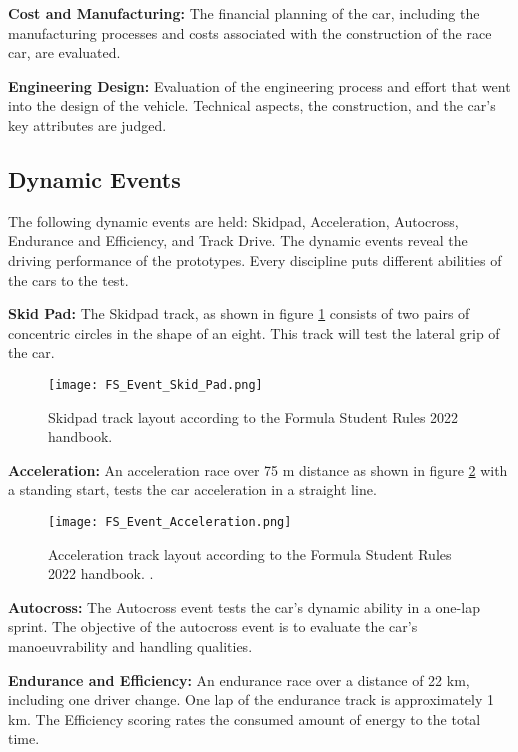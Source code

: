 \textbf{Cost and Manufacturing:} The financial planning of the car, including the manufacturing processes and costs associated with the construction of the race car, are evaluated.

\textbf{Engineering Design:} Evaluation of the engineering process and effort that went into the design of the vehicle. Technical aspects, the construction, and the car's key attributes are judged.

\subsection{Dynamic Events} \label{sec:Dynamic Events}
The following dynamic events are held: Skidpad, Acceleration, Autocross, Endurance and Efficiency, and Track Drive.
The dynamic events reveal the driving performance of the prototypes. Every discipline puts different abilities of the cars to the test. \cite{fs_rules_2022_handbook}

\textbf{Skid Pad:} The Skidpad track, as shown in figure \ref{fig:FS Skidpad layout} consists of two pairs of concentric circles in the shape of an eight. This track will test the lateral grip of the car.
\begin{figure}[H]
    \centering
    \texttt{[image: FS\_Event\_Skid\_Pad.png]}
    \caption{Skidpad track layout according to the Formula Student Rules 2022 handbook. \cite{fs_rules_2022_handbook}}
    \label{fig:FS Skidpad layout}
\end{figure}

\pagebreak

\textbf{Acceleration:} An acceleration race over 75 m distance as shown in figure \ref{fig:FS Acceleration layout} with a standing start, tests the car acceleration in a straight line.
\begin{figure}[H]
    \centering
    \texttt{[image: FS\_Event\_Acceleration.png]}
    \caption{Acceleration track layout according to the Formula Student Rules 2022 handbook. \cite{fs_rules_2022_handbook}.}
    \label{fig:FS Acceleration layout}
\end{figure}

\textbf{Autocross:} The Autocross event tests the car's dynamic ability in a one-lap sprint. The objective of the autocross event is to evaluate the car's manoeuvrability and handling qualities.

\textbf{Endurance and Efficiency:} An endurance race over a distance of 22 km, including one driver change. One lap of the endurance track is approximately 1 km. The Efficiency scoring rates the consumed amount of energy to the total time.

